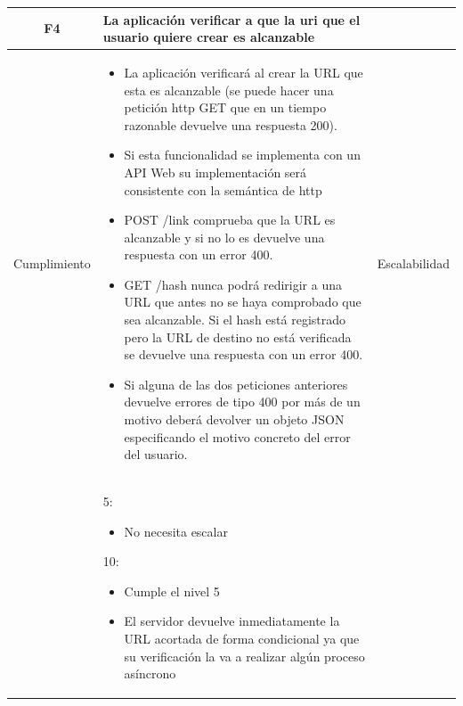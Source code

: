 \documentclass{article}
\begin{document}
\begin{table}[hbtp]
    \footnotesize
    \centering
    \settowidth{}
    \setlength\extrarowheight{5pt}
    \begin{tabulary}{\textwidth}{ C L }
        \textbf{F4} & La aplicación verificar a que la uri que el usuario quiere crear es alcanzable
        \\
    \hline
    
    Cumplimiento &
    \begin{itemize}
        \item La aplicación verificará al crear la URL que esta es alcanzable (se
        puede hacer una petición http GET que en un tiempo razonable
        devuelve una respuesta 200).
 
        \item Si esta funcionalidad se implementa con un API Web su
        implementación será consistente con la semántica de http
 
        \item POST /link comprueba que la URL es alcanzable y si no lo es devuelve
        una respuesta con un error 400.
 
        \item GET /{hash} nunca podrá redirigir a una URL que antes no se haya
        comprobado que sea alcanzable. Si el hash está registrado pero la
        URL de destino no está verificada se devuelve una respuesta con un
        error 400.
 
        \item Si alguna de las dos peticiones anteriores devuelve errores de tipo
        400 por más de un motivo deberá devolver un objeto JSON
        especificando el motivo concreto del error del usuario.
    \end{itemize} &
        
    Escalabilidad\\ &
    5:
    \begin{itemize}
        \item No necesita escalar
        
    \end{itemize} 
    10:
    \begin{itemize}
        \item Cumple el nivel 5
		
		\item El servidor devuelve inmediatamente la URL acortada de forma
        condicional ya que su verificación la va a realizar algún proceso
        asíncrono
		

\end{itemize}
\end{tabulary}
\end{table}
\end{document}
